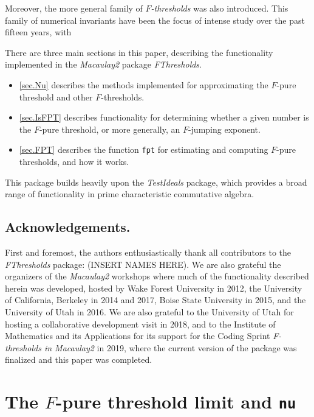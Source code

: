 \documentclass{amsart}
\begin{document}
Moreover, the more general family of \emph{$F$-thresholds} was also introduced. 
This family of numerical invariants have been the focus of intense study over the past fifteen years, with 



There are three main sections in this paper, describing the functionality implemented in the \emph{Macaulay2} package \emph{FThresholds}. 
\begin{itemize}
\item{} \autoref{sec.Nu} describes the methods implemented for approximating the $F$-pure threshold and other $F$-thresholds.  
\item{} \autoref{sec.IsFPT} describes functionality for determining whether a given number is the $F$-pure threshold, or more generally, an $F$-jumping exponent.
\item{} \autoref{sec.FPT} describes the function {\tt fpt} for estimating and computing $F$-pure thresholds, and how it works.
\end{itemize}

This package builds heavily upon the \emph{TestIdeals} package, which provides a broad range of functionality in prime characteristic commutative algebra. 

\subsection*{Acknowledgements.}  First and foremost, the authors enthusiastically thank all contributors to the \emph{FThresholds} package: (INSERT NAMES HERE). %
We are also grateful the organizers of the \emph{Macaulay2} workshops where much of the functionality described herein was developed, hosted by Wake Forest University in 2012, the University of California, Berkeley in 2014 and 2017, Boise State University in 2015, and the University of Utah in 2016. 
We are also grateful to the University of Utah for hosting a collaborative development visit in 2018, and to the Institute of Mathematics and its Applications for its support for the Coding Sprint \emph{F-thresholds in Macaulay2} in 2019, where the current version of the package was finalized and this paper was completed. 

\section{The $F$-pure threshold limit and {\tt nu}}
\label{sec.Nu}
\end{document}
